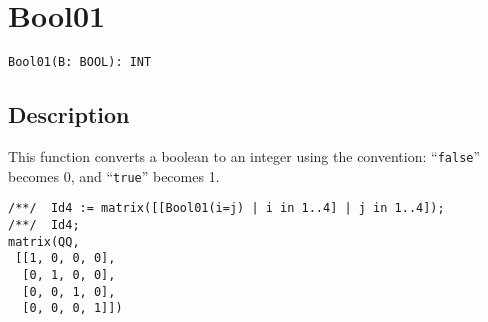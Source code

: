 \documentclass[a4paper]{mybook}
\newenvironment{command}{}{} %
\begin{document}
\section{Bool01}
\label{Bool01}
\begin{command} %


\begin{Verbatim}[label=syntax, rulecolor=\color{MidnightBlue},
frame=single]
Bool01(B: BOOL): INT
\end{Verbatim}


\subsection*{Description}

This function converts a boolean to an integer using the convention:
``\verb&false&'' becomes 0, and ``\verb&true&'' becomes 1.
\begin{Verbatim}[label=example, rulecolor=\color{PineGreen}, frame=single]
/**/  Id4 := matrix([[Bool01(i=j) | i in 1..4] | j in 1..4]);
/**/  Id4;
matrix(QQ,
 [[1, 0, 0, 0],
  [0, 1, 0, 0],
  [0, 0, 1, 0],
  [0, 0, 0, 1]])
\end{Verbatim}


\end{command} %
\end{document}
